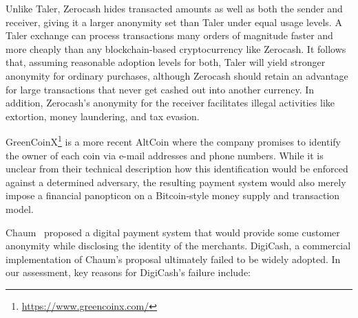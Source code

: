 \documentclass[sigconf, authordraft]{acmart}
\begin{document}
Unlike Taler, Zerocash hides transacted amounts as well as both the
sender and receiver, giving it a larger anonymity set than Taler under
equal usage levels.  A Taler exchange can process transactions many
orders of magnitude faster and more cheaply than any blockchain-based
cryptocurrency like Zerocash.  It follows that, assuming reasonable
adoption levels for both, Taler will yield stronger anonymity for
ordinary purchases, although Zerocash should retain an advantage for
large transactions that never get cashed out into another currency.
In addition, Zerocash's anonymity for the receiver facilitates illegal
activities like extortion, money laundering, and tax evasion.

GreenCoinX\footnote{\url{https://www.greencoinx.com/}} is a more
recent AltCoin where the company promises to identify the owner of
each coin via e-mail addresses and phone numbers.  While it is unclear
from their technical description how this identification would be
enforced against a determined adversary, the resulting payment system
would also merely impose a financial panopticon on a Bitcoin-style
money supply and transaction model.


Chaum~\cite{chaum1983blind} proposed a digital payment system that
would provide some customer anonymity while disclosing the identity of
the merchants.  DigiCash, a commercial implementation of Chaum's
proposal ultimately failed to be widely adopted.  In our assessment,
key reasons for DigiCash's failure include:
\end{document}
